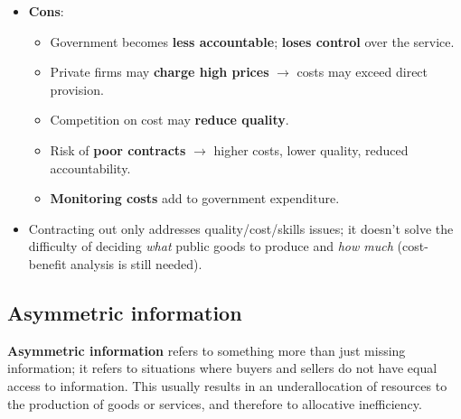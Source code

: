 \documentclass[a4paper,12pt]{article}
\newcommand{\needbold}[1]{\textcolor{red!70!black}{\textbf{#1}}}
\begin{document}
\begin{itemize}
\begin{itemize}
\begin{itemize}
    \end{itemize}
    \item \textbf{Cons}:
    \begin{itemize}
      \item Government becomes \textbf{less accountable}; \textbf{loses control} over the service.
      \item Private firms may \textbf{charge high prices} $\to$ costs may exceed direct provision.
      \item Competition on cost may \textbf{reduce quality}.
      \item Risk of \textbf{poor contracts} $\to$ higher costs, lower quality, reduced accountability.
      \item \textbf{Monitoring costs} add to government expenditure.
    \end{itemize}
    \item Contracting out only addresses quality/cost/skills issues; it doesn't solve the difficulty of deciding \textit{what} public goods to produce and \textit{how much} (cost-benefit analysis is still needed).
  \end{itemize}
\end{itemize}
\subsection{Asymmetric information}
\needbold{Asymmetric information} refers to something more than just missing information; it refers to situations where buyers and sellers do not have equal access to information.
This usually results in an underallocation of resources to the production of goods or services, and therefore to allocative inefficiency.
\end{document}
